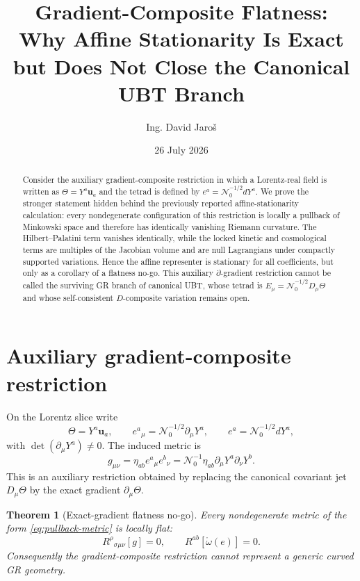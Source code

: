 \documentclass[11pt,a4paper]{article}
\title{Gradient-Composite Flatness:\\
Why Affine Stationarity Is Exact but Does Not Close the Canonical UBT Branch}
\author{Ing. David Jaro\v{s}}
\date{26 July 2026}
\newtheorem{theorem}{Theorem}
\begin{document}
\maketitle

\begin{abstract}
Consider the auxiliary gradient-composite restriction in which a Lorentz-real
field is written as $\Theta=Y^a\mathbf u_a$ and the tetrad is defined by
$e^a=\mathcal N_0^{-1/2}dY^a$.  We prove the stronger statement hidden behind
the previously reported affine-stationarity calculation: every nondegenerate
configuration of this restriction is locally a pullback of Minkowski space and
therefore has identically vanishing Riemann curvature.  The Hilbert--Palatini
term vanishes identically, while the locked kinetic and cosmological terms are
multiples of the Jacobian volume and are null Lagrangians under compactly
supported variations.  Hence the affine representer is stationary for all
coefficients, but only as a corollary of a flatness no-go.  This auxiliary
$\partial$-gradient restriction cannot be called the surviving GR branch of
canonical UBT, whose tetrad is $E_\mu=\mathcal N_0^{-1/2}D_\mu\Theta$ and whose
self-consistent $D$-composite variation remains open.
\end{abstract}

\section{Auxiliary gradient-composite restriction}
On the Lorentz slice write
\begin{equation}
 \Theta=Y^a\mathbf u_a,
 \qquad
 e^a{}_{\mu}=\mathcal N_0^{-1/2}\partial_\mu Y^a,
 \qquad
 e^a=\mathcal N_0^{-1/2}dY^a,
 \label{eq:gradient-coframe}
\end{equation}
with $\det(\partial_\mu Y^a)\neq0$.  The induced metric is
\begin{equation}
 g_{\mu\nu}=\eta_{ab}e^a{}_{\mu}e^b{}_{\nu}
 =\mathcal N_0^{-1}\eta_{ab}\partial_\mu Y^a\partial_\nu Y^b.
 \label{eq:pullback-metric}
\end{equation}
This is an auxiliary restriction obtained by replacing the canonical
covariant jet $D_\mu\Theta$ by the exact gradient $\partial_\mu\Theta$.

\begin{theorem}[Exact-gradient flatness no-go]
\label{thm:gradient-flatness}
Every nondegenerate metric of the form \eqref{eq:pullback-metric} is locally
flat:
\begin{equation}
 R^\rho{}_{\sigma\mu\nu}[g]=0,
 \qquad
 R^{ab}[\mathring\omega(e)]=0.
\end{equation}
Consequently the gradient-composite restriction cannot represent a generic
curved GR geometry.
\end{theorem}
\end{document}
